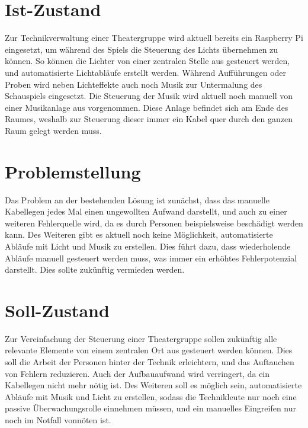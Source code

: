 

\section{Ist-Zustand}
Zur Technikverwaltung einer Theatergruppe wird aktuell bereits ein Raspberry
Pi eingesetzt, um während des Spiels die Steuerung des Lichts übernehmen zu
können. So können die Lichter von einer zentralen Stelle aus gesteuert werden,
und automatisierte Lichtabläufe erstellt werden. Während Aufführungen oder
Proben wird neben Lichteffekte auch noch Musik zur Untermalung des
Schauspiels eingesetzt. Die Steuerung der Musik wird aktuell noch manuell von
einer Musikanlage aus vorgenommen. Diese Anlage befindet sich am Ende des
Raumes, weshalb zur Steuerung dieser immer ein Kabel quer durch den ganzen
Raum gelegt werden muss.

\section{Problemstellung}
Das Problem an der bestehenden Lösung ist zunächst, dass das manuelle
Kabellegen jedes Mal einen ungewollten Aufwand darstellt, und auch zu einer
weiteren Fehlerquelle wird, da es durch Personen beispielsweise beschädigt
werden kann. Des Weiteren gibt es aktuell noch keine Möglichkeit, automatisierte
Abläufe mit Licht und Musik zu erstellen. Dies führt dazu, dass wiederholende
Abläufe manuell gesteuert werden muss, was immer ein erhöhtes Fehlerpotenzial
darstellt. Dies sollte zukünftig vermieden werden.


\section{Soll-Zustand}
Zur Vereinfachung der Steuerung einer Theatergruppe sollen zukünftig alle
relevante Elemente von einem zentralen Ort aus gesteuert werden können. Dies
soll die Arbeit der Personen hinter der Technik erleichtern, und das Auftauchen
von Fehlern reduzieren. Auch der Aufbauaufwand wird verringert, da ein
Kabellegen nicht mehr nötig ist. Des Weiteren soll es möglich sein,
automatisierte Abläufe mit Musik und Licht zu erstellen, sodass die
Technikleute nur noch eine passive Überwachungsrolle einnehmen müssen, und ein
manuelles Eingreifen nur noch im
Notfall vonnöten ist. 


